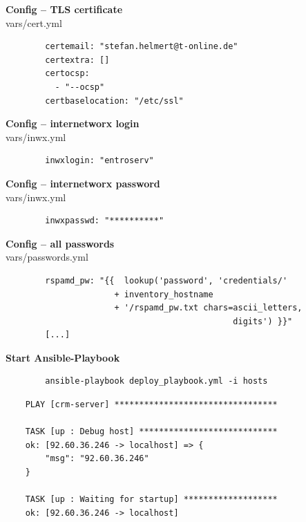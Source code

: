 \documentclass{beamer}
\begin{document}
\begin{frame}[fragile]{\insertsection}{\insertsubsection}
	\vspace{-0.5cm}
	\textbf{Config -- TLS certificate}\\
	vars/cert.yml
	\begin{verbatim}
		certemail: "stefan.helmert@t-online.de"
		certextra: []
		certocsp:
		  - "--ocsp"
		certbaselocation: "/etc/ssl"
	\end{verbatim}
\end{frame}	

\begin{frame}[fragile]{\insertsection}{\insertsubsection}
	\vspace{-0.5cm}
	\textbf{Config -- internetworx login}\\
	vars/inwx.yml
	\begin{verbatim}
		inwxlogin: "entroserv"
	\end{verbatim}
	
	\textbf{Config -- internetworx password}\\
	vars/inwx.yml
	\begin{verbatim}
		inwxpasswd: "**********"
	\end{verbatim}
\end{frame}	

\begin{frame}[fragile]{\insertsection}{\insertsubsection}
	\vspace{-0.5cm}
	\textbf{Config -- all passwords}\\
	vars/passwords.yml
	\begin{verbatim}
		rspamd_pw: "{{  lookup('password', 'credentials/'
		              + inventory_hostname
		              + '/rspamd_pw.txt chars=ascii_letters,
		                                      digits') }}"
		[...]
	\end{verbatim}
\end{frame}	

\begin{frame}[fragile]{\insertsection}{\insertsubsection}
	\vspace{-0.5cm}
	\textbf{Start Ansible-Playbook}\\
	\begin{verbatim}
		ansible-playbook deploy_playbook.yml -i hosts
	\end{verbatim}
	
	\begin{verbatim}
	PLAY [crm-server] *********************************
	
	TASK [up : Debug host] ****************************
	ok: [92.60.36.246 -> localhost] => {
	    "msg": "92.60.36.246"
	}
	
	TASK [up : Waiting for startup] *******************
	ok: [92.60.36.246 -> localhost]
	\end{verbatim}
\end{frame}
\end{document}
